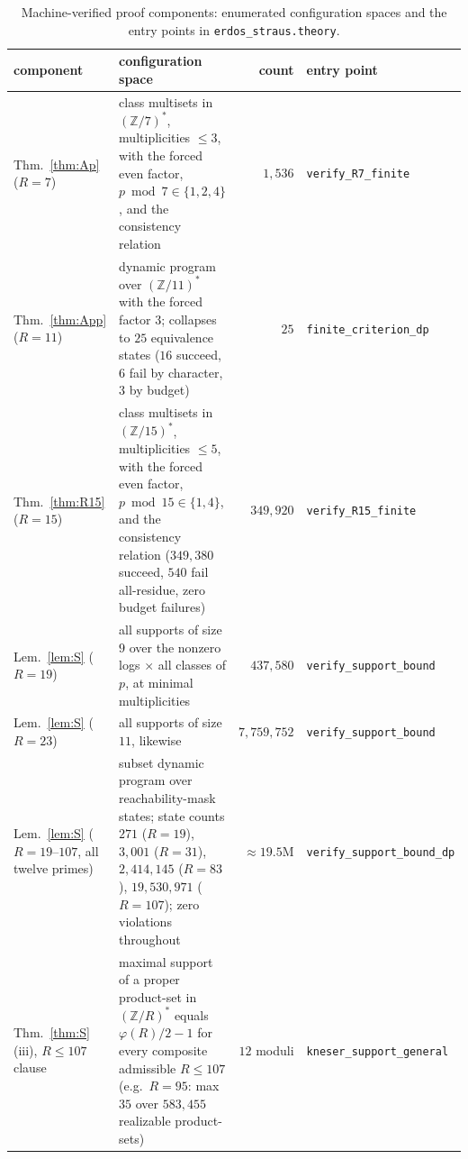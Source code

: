 \documentclass[11pt]{article}
\theoremstyle{plain}
\theoremstyle{remark}
\theoremstyle{plain}
\numberwithin{equation}{section}
\begin{document}
\begin{table}[htbp]
\centering
\small
\begin{tabular}{>{\raggedright\arraybackslash}p{2.5cm}>{\raggedright\arraybackslash}p{4.4cm}r>{\raggedright\arraybackslash}p{4.4cm}}
\toprule
component & configuration space & count & entry point \\ \midrule
Thm.~\ref{thm:Ap} ($R=7$) &
class multisets in $(\mathbb{Z}/7)^*$, multiplicities $\le 3$, with the
forced even factor, $p \bmod 7 \in \{1,2,4\}$, and the consistency
relation & $1{,}536$ &
\texttt{verify\_R7\_finite} \\ \addlinespace
Thm.~\ref{thm:App} ($R=11$) &
dynamic program over $(\mathbb{Z}/11)^*$ with the forced factor $3$;
collapses to $25$ equivalence states ($16$ succeed, $6$ fail by
character, $3$ by budget) & $25$ &
\texttt{finite\_criterion\_dp} \\ \addlinespace
Thm.~\ref{thm:R15} ($R=15$) &
class multisets in $(\mathbb{Z}/15)^*$, multiplicities $\le 5$, with the
forced even factor, $p \bmod 15 \in \{1, 4\}$, and the consistency
relation ($349{,}380$ succeed, $540$ fail all-residue, zero budget
failures) & $349{,}920$ &
\texttt{verify\_R15\_finite} \\ \addlinespace
Lem.~\ref{lem:S} ($R=19$) &
all supports of size $9$ over the nonzero logs $\times$ all classes of
$p$, at minimal multiplicities & $437{,}580$ &
\texttt{verify\_support\_bound} \\ \addlinespace
Lem.~\ref{lem:S} ($R=23$) &
all supports of size $11$, likewise & $7{,}759{,}752$ &
\texttt{verify\_support\_bound} \\ \addlinespace
Lem.~\ref{lem:S} ($R = 19$--$107$, all twelve primes) &
subset dynamic program over reachability-mask states; state counts
$271$ ($R{=}19$), $3{,}001$ ($R{=}31$), $2{,}414{,}145$ ($R{=}83$),
$19{,}530{,}971$ ($R{=}107$); zero violations throughout &
$\approx 19.5$M &
\texttt{verify\_support\_bound\_dp} \\ \addlinespace
Thm.~\ref{thm:S}(iii), $R \le 107$ clause &
maximal support of a proper product-set in $(\mathbb{Z}/R)^*$ equals
$\varphi(R)/2 - 1$ for every composite admissible $R \le 107$ (e.g.\
$R = 95$: max $35$ over $583{,}455$ realizable product-sets) &
$12$ moduli &
\texttt{kneser\_support\_general} \\
\bottomrule
\end{tabular}
\caption{Machine-verified proof components: enumerated configuration
spaces and the entry points in \texttt{erdos\_straus.theory}.}
\label{tab:components}
\end{table}
\end{document}
